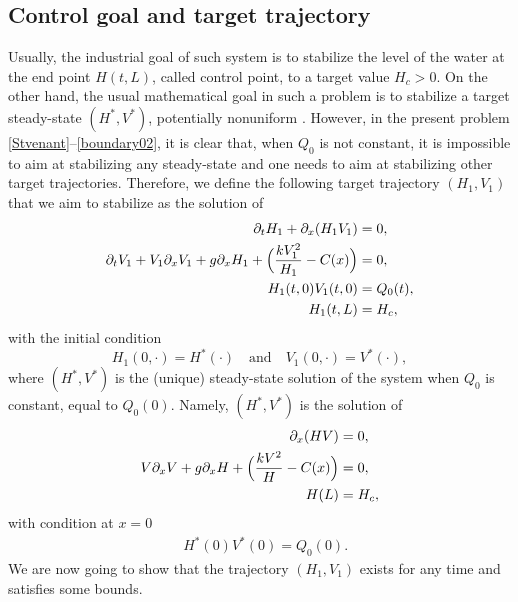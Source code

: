 \documentclass[11pt]{article}
\numberwithin{equation}{section}
\theoremstyle{definition}
\begin{document}
\subsection{Control goal and target trajectory}
Usually, the industrial goal of such system is to stabilize the level of the water at the end point $H(t,L)$, called control point, to a target value $H_{c}>0$.
On the other hand, the usual mathematical goal in such a problem is to stabilize a target steady-state $(H^{*},V^{*})$, potentially nonuniform \cite[Preface]{BastinCoron1D}. However, in the present problem \eqref{Stvenant}--\eqref{boundary02}, it is clear that, when $Q_{0}$
is not constant, it is impossible to aim at stabilizing any steady-state and one needs to aim at stabilizing other target trajectories.
Therefore, we define the following target trajectory $(H_{1},V_{1})$ that we aim to stabilize as the solution of
\begin{equation}\label{target}
\begin{split}
\partial_{t}H_{1}+\partial_{x}(H_{1}V_{1})&=0,\\
\partial_{t}V_{1}+V_{1}\partial_{x}V_{1}+g\partial_{x}H_{1}+\Bigl(\frac{kV_{1}^{2}}{H_{1}}-C(x)\Bigr)&=0,\\
H_{1}(t,0)V_{1}(t,0)&=Q_{0}(t),\\
H_{1}(t,L)&=H_{c},
\end{split}
\end{equation}
with the initial condition
\begin{equation}\label{initialtarget}
H_{1}(0,\cdot)=H^{*}(\cdot)\quad\text{and}\quad V_{1}(0,\cdot)=V^{*}(\cdot),
\end{equation}
where $(H^{*},V^{*})$ is the (unique) steady-state solution of the system {when $Q_{0}$ is} constant, equal to $Q_{0}(0)$. Namely, $(H^{*},V^{*})$ is the solution of
\begin{equation}
\label{targetsteady0}
\begin{split}
\partial_{x}(HV)&=0,\\
V\partial_{x}V+g\partial_{x}H+\Bigl(\frac{kV^{2}}{H}-C(x)\Bigr)&=0,\\
H(L)&=H_{c},
\end{split}
\end{equation}
with condition at $x=0$
\begin{equation}
\begin{split}
&H^{*}(0)V^{*}(0)=Q_{0}(0).
\end{split}
\label{targetsteady}
\end{equation}
We are now going to show that the trajectory $(H_{1},V_{1})$ exists for any time and satisfies some bounds.
\end{document}
